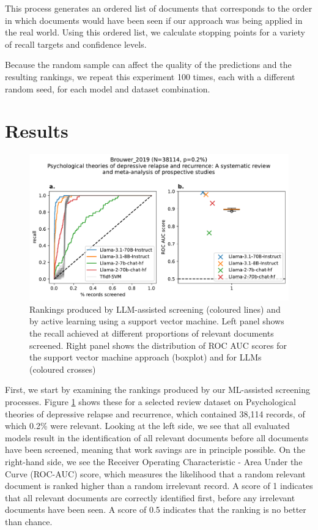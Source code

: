 \documentclass{article}
\begin{document}
	This process generates an ordered list of documents that corresponds to the order in which documents would have been seen if our approach was being applied in the real world. Using this ordered list, we calculate stopping points for a variety of recall targets and confidence levels.
	
	Because the random sample can affect the quality of the predictions and the resulting rankings, we repeat this experiment 100 times, each with a different random seed, for each model and dataset combination. 
	
	\section*{Results}
	
	\begin{figure}
		\includegraphics[width=\linewidth]{../../figures/Brouwer_2019.pdf}
		\caption{Rankings produced by LLM-assisted screening (coloured lines) and by active learning using a support vector machine. Left panel shows the recall achieved at different proportions of relevant documents screened. Right panel shows the distribution of ROC AUC scores for the support vector machine approach (boxplot) and for LLMs (coloured crosses)}
		\label{fig:rankings}
	\end{figure}
	
	First, we start by examining the rankings produced by our ML-assisted screening processes. Figure \ref{fig:rankings} shows these for a selected review dataset on Psychological theories of depressive relapse and recurrence, which contained 38,114 records, of which 0.2\% were relevant. Looking at the left side, we see that all evaluated models result in the identification of all relevant documents before all documents have been screened, meaning that work savings are in principle possible. On the right-hand side, we see the Receiver Operating Characteristic - Area Under the Curve (ROC-AUC) score, which measures the likelihood that a random relevant document is ranked higher than a random irrelevant record. A score of 1 indicates that all relevant documents are correctly identified first, before any irrelevant documents have been seen. A score of 0.5 indicates that the ranking is no better than chance.
	
\end{document}
